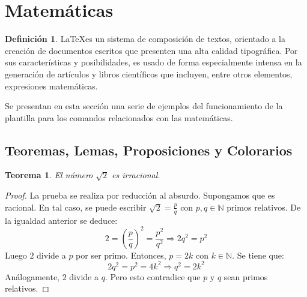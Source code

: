 \documentclass{article}
\theoremstyle{theorem-style}  %
\newtheorem{theorem}{Teorema}[section]  %
\theoremstyle{definition}
\newtheorem{definition}{Definición}[section]
\theoremstyle{example-style}
\begin{document}
	
\maketitle



\newpage
\tableofcontents
\newpage
	

\section{Matemáticas}

    \begin{definition}
        \LaTeX es un sistema de composición de textos, orientado a la creación de documentos escritos que presenten una alta calidad tipográfica. Por sus características y  posibilidades, es usado de forma especialmente intensa en la generación de artículos y libros científicos que incluyen, entre otros elementos, expresiones matemáticas.
    \end{definition}
    
    Se presentan en esta sección una serie de ejemplos del funcionamiento de la plantilla 
    para los comandos relacionados con las matemáticas.
    
    \subsection{Teoremas, Lemas, Proposiciones y Colorarios}
    
        \begin{theorem}
            El número $\sqrt{2}$ es irracional.
        \end{theorem}
        \begin{proof}
            La prueba se realiza por reducción al absurdo. Supongamos que es racional. En tal caso, se puede escribir $\sqrt{2} = \frac{p}{q}$ con $p,q \in \mathbb{N}$ primos relativos. De la igualdad anterior se deduce:
            $$ 2 = \left(\frac{p}{q}\right)^2 = \frac{p^2}{q^2} \Rightarrow 2 q^2 = p^2 $$
            Luego $2$ divide a $p$ por ser primo. Entonces, $p = 2k$ con $k \in \mathbb{N}$. Se tiene que:
            $$ 2 q^2 = p^2 = 4k^2 \Rightarrow q^2 = 2k^2 $$
            Análogamente, $2$ divide a $q$. Pero esto contradice que $p$ y $q$ sean primos relativos.
        \end{proof}
        
\end{document}
